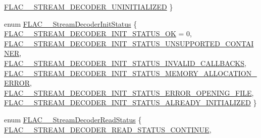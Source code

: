\begin{DoxyCompactItemize}
\mbox{\hyperlink{group__flac__stream__decoder_gga3adb6891c5871a87cd5bbae6c770ba2da565eaf4d5e68b440ecec771cb22d3427}{F\+L\+A\+C\+\_\+\+\_\+\+S\+T\+R\+E\+A\+M\+\_\+\+D\+E\+C\+O\+D\+E\+R\+\_\+\+U\+N\+I\+N\+I\+T\+I\+A\+L\+I\+Z\+ED}}
 \}
\item 
enum \mbox{\hyperlink{group__flac__stream__decoder_gaaed54a24ac6310d29c5cafba79759c44}{F\+L\+A\+C\+\_\+\+\_\+\+Stream\+Decoder\+Init\+Status}} \{ \newline
\mbox{\hyperlink{group__flac__stream__decoder_ggaaed54a24ac6310d29c5cafba79759c44ac94c7e9396f30642f34805e5d626e011}{F\+L\+A\+C\+\_\+\+\_\+\+S\+T\+R\+E\+A\+M\+\_\+\+D\+E\+C\+O\+D\+E\+R\+\_\+\+I\+N\+I\+T\+\_\+\+S\+T\+A\+T\+U\+S\+\_\+\+OK}} = 0, 
\mbox{\hyperlink{group__flac__stream__decoder_ggaaed54a24ac6310d29c5cafba79759c44a8f2188c616c9bc09638eece3ae55f152}{F\+L\+A\+C\+\_\+\+\_\+\+S\+T\+R\+E\+A\+M\+\_\+\+D\+E\+C\+O\+D\+E\+R\+\_\+\+I\+N\+I\+T\+\_\+\+S\+T\+A\+T\+U\+S\+\_\+\+U\+N\+S\+U\+P\+P\+O\+R\+T\+E\+D\+\_\+\+C\+O\+N\+T\+A\+I\+N\+ER}}, 
\mbox{\hyperlink{group__flac__stream__decoder_ggaaed54a24ac6310d29c5cafba79759c44a798ad4b6c4e556fd4cb1afbc29562eca}{F\+L\+A\+C\+\_\+\+\_\+\+S\+T\+R\+E\+A\+M\+\_\+\+D\+E\+C\+O\+D\+E\+R\+\_\+\+I\+N\+I\+T\+\_\+\+S\+T\+A\+T\+U\+S\+\_\+\+I\+N\+V\+A\+L\+I\+D\+\_\+\+C\+A\+L\+L\+B\+A\+C\+KS}}, 
\mbox{\hyperlink{group__flac__stream__decoder_ggaaed54a24ac6310d29c5cafba79759c44a0110567f0715c6f87357388bc7fa98f9}{F\+L\+A\+C\+\_\+\+\_\+\+S\+T\+R\+E\+A\+M\+\_\+\+D\+E\+C\+O\+D\+E\+R\+\_\+\+I\+N\+I\+T\+\_\+\+S\+T\+A\+T\+U\+S\+\_\+\+M\+E\+M\+O\+R\+Y\+\_\+\+A\+L\+L\+O\+C\+A\+T\+I\+O\+N\+\_\+\+E\+R\+R\+OR}}, 
\newline
\mbox{\hyperlink{group__flac__stream__decoder_ggaaed54a24ac6310d29c5cafba79759c44a8184c306e0cd2565a8c5adc1381cb469}{F\+L\+A\+C\+\_\+\+\_\+\+S\+T\+R\+E\+A\+M\+\_\+\+D\+E\+C\+O\+D\+E\+R\+\_\+\+I\+N\+I\+T\+\_\+\+S\+T\+A\+T\+U\+S\+\_\+\+E\+R\+R\+O\+R\+\_\+\+O\+P\+E\+N\+I\+N\+G\+\_\+\+F\+I\+LE}}, 
\mbox{\hyperlink{group__flac__stream__decoder_ggaaed54a24ac6310d29c5cafba79759c44a98bc501c9b2fb5d92d8bb0b3321d504f}{F\+L\+A\+C\+\_\+\+\_\+\+S\+T\+R\+E\+A\+M\+\_\+\+D\+E\+C\+O\+D\+E\+R\+\_\+\+I\+N\+I\+T\+\_\+\+S\+T\+A\+T\+U\+S\+\_\+\+A\+L\+R\+E\+A\+D\+Y\+\_\+\+I\+N\+I\+T\+I\+A\+L\+I\+Z\+ED}}
 \}
\item 
enum \mbox{\hyperlink{group__flac__stream__decoder_gad793ead451206c64a91dc0b851027b93}{F\+L\+A\+C\+\_\+\+\_\+\+Stream\+Decoder\+Read\+Status}} \{ \mbox{\hyperlink{group__flac__stream__decoder_ggad793ead451206c64a91dc0b851027b93a9a5be0fcf0279b98b2fd462bc4871d06}{F\+L\+A\+C\+\_\+\+\_\+\+S\+T\+R\+E\+A\+M\+\_\+\+D\+E\+C\+O\+D\+E\+R\+\_\+\+R\+E\+A\+D\+\_\+\+S\+T\+A\+T\+U\+S\+\_\+\+C\+O\+N\+T\+I\+N\+UE}}, 

\end{DoxyCompactItemize}
